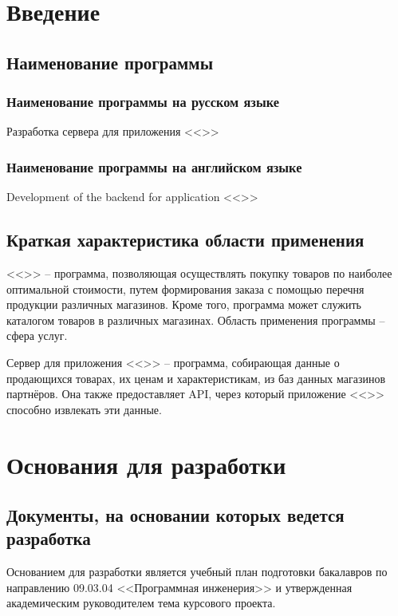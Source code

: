 \documentclass[a4paper,12pt,reqno]{article}
\begin{document}
  \CRTsign
  \CRTpreamble

  \section{Введение}
  \subsection{Наименование программы}
  \subsubsection{Наименование программы на русском языке}
  Разработка сервера для приложения <<\CRTname>>
  \subsubsection{Наименование программы на английском языке}
  Development of the backend for application <<\CRTnameeng>>


  \subsection{Краткая характеристика области применения}
  <<\CRTname>> -- программа, позволяющая осуществлять покупку товаров по наиболее оптимальной стоимости,
  путем формирования заказа с помощью перечня продукции различных магазинов.
  Кроме того, программа может служить каталогом товаров в различных магазинах.
  Область применения программы -- сфера услуг.

  Сервер для приложения <<\CRTname>> -- программа, собирающая данные о продающихся товарах, их ценам и характеристикам,
  из баз данных магазинов партнёров.
  Она также предоставляет API, через который приложение <<\CRTname>> способно извлекать эти данные.

  \newpage
  \section{Основания для разработки}
  \subsection{Документы, на основании которых ведется разработка}
  Основанием для разработки является учебный план подготовки бакалавров по направлению 09.03.04 <<Программная инженерия>> и утвержденная академическим руководителем тема курсового проекта.
\end{document}
